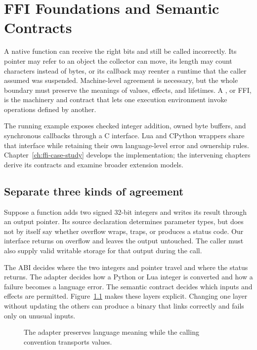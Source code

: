 \chapter{FFI Foundations and Semantic Contracts}
\label{ch:ffi-foundations}

A native function can receive the right bits and still be called incorrectly.
Its pointer may refer to an object the collector can move, its length may count characters instead of bytes, or its callback may reenter a runtime that the caller assumed was suspended.
Machine-level agreement is necessary, but the whole boundary must preserve the meanings of values, effects, and lifetimes.
A , or FFI, is the machinery and contract that lets one execution environment invoke operations defined by another.

The running example exposes checked integer addition, owned byte buffers, and synchronous callbacks through a C interface.
Lua and CPython wrappers share that interface while retaining their own language-level error and ownership rules.
Chapter~\ref{ch:ffi-case-study} develops the implementation; the intervening chapters derive its contracts and examine broader extension models.

\section{Separate three kinds of agreement}
\label{sec:ch69-layers}
Suppose a function adds two signed 32-bit integers and writes its result through an output pointer.
Its source declaration determines parameter types, but does not by itself say whether overflow wraps, traps, or produces a status code.
Our interface returns  on overflow and leaves the output untouched.
The caller must also supply valid writable storage for that output during the call.

The ABI decides where the two integers and pointer travel and where the status returns.
The adapter decides how a Python or Lua integer is converted and how a failure becomes a language error.
The semantic contract decides which inputs and effects are permitted.
Figure~\ref{fig:ch69-layers} makes these layers explicit.
Changing one layer without updating the others can produce a binary that links correctly and fails only on unusual inputs.

\begin{figure}[htbp]
\centering
{}
\caption{The adapter preserves language meaning while the calling convention transports values.}
\label{fig:ch69-layers}
\end{figure}

